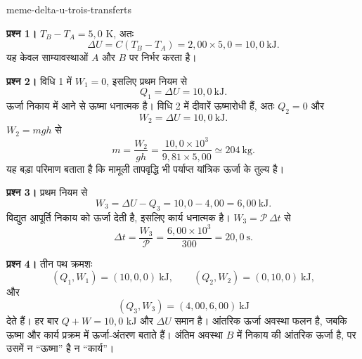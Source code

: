\begin{exo}[आंतरिक ऊर्जा का समान परिवर्तन, अंतरण के तीन ढंग]{meme-delta-u-trois-transferts}
\begin{solution}
\textbf{प्रश्न 1।} $T_B-T_A=5{,}0$ K, अतः
\[
\Delta U=C(T_B-T_A)=2{,}00\times5{,}0=10{,}0\ \mathrm{kJ}.
\]
यह केवल साम्यावस्थाओं $A$ और $B$ पर निर्भर करता है।

\textbf{प्रश्न 2।} विधि 1 में $W_1=0$, इसलिए प्रथम नियम से
\[
Q_1=\Delta U=10{,}0\ \mathrm{kJ}.
\]
ऊर्जा निकाय में आने से ऊष्मा धनात्मक है। विधि 2 में दीवारें ऊष्मारोधी हैं, अतः $Q_2=0$ और
\[
W_2=\Delta U=10{,}0\ \mathrm{kJ}.
\]
$W_2=mgh$ से
\[
m=\frac{W_2}{gh}
=\frac{10{,}0\times10^3}{9{,}81\times5{,}00}
\simeq204\ \mathrm{kg}.
\]
यह बड़ा परिमाण बताता है कि मामूली तापवृद्धि भी पर्याप्त यांत्रिक ऊर्जा के तुल्य है।

\textbf{प्रश्न 3।} प्रथम नियम से
\[
W_3=\Delta U-Q_3=10{,}0-4{,}00=6{,}00\ \mathrm{kJ}.
\]
विद्युत आपूर्ति निकाय को ऊर्जा देती है, इसलिए कार्य धनात्मक है। $W_3=\mathcal P\,\Delta t$ से
\[
\Delta t=\frac{W_3}{\mathcal P}=\frac{6{,}00\times10^3}{300}=20{,}0\ \mathrm{s}.
\]

\textbf{प्रश्न 4।} तीन पथ क्रमशः
\[
(Q_1,W_1)=(10{,}0,0)\ \mathrm{kJ},\qquad
(Q_2,W_2)=(0,10{,}0)\ \mathrm{kJ},
\]
और
\[
(Q_3,W_3)=(4{,}00,6{,}00)\ \mathrm{kJ}
\]
देते हैं। हर बार $Q+W=10{,}0$ kJ और $\Delta U$ समान है। आंतरिक ऊर्जा अवस्था फलन है,
जबकि ऊष्मा और कार्य प्रक्रम में ऊर्जा-अंतरण बताते हैं। अंतिम अवस्था $B$ में निकाय की आंतरिक ऊर्जा है,
पर उसमें न “ऊष्मा” है न “कार्य”।
\end{solution}
\end{exo}

